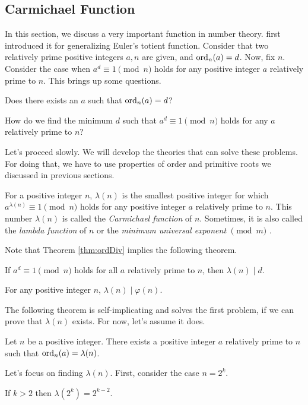 \subsection{Carmichael Function}
In this section, we discuss a very important function in number theory. \textcite{carmichael_1910} first introduced it for generalizing Euler's totient function. Consider that two relatively prime positive integers $a,n$ are given, and $\operatorname{ord}_n(a)=d$. Now, fix $n$. Consider the case when $a^d\equiv1\pmod n$ holds for any positive integer $a$ relatively prime to $n$. This brings up some questions.
\begin{problem}\label{prob:CarmichaelQuestion1}
	Does there exists an $a$ such that $\operatorname{ord}_n(a)=d$?
\end{problem}

\begin{problem}\label{prob:CarmichaelQuestion2}
	How do we find the minimum $d$ such that $a^d\equiv1\pmod n$ holds for any $a$ relatively prime to $n$?
\end{problem}
Let's proceed slowly. We will develop the theories that can solve these problems. For doing that, we have to use properties of order and primitive roots we discussed in previous sections.
\begin{definition}
	For a positive integer $n$, $\lambda(n)$ is the smallest positive integer for which $a^{\lambda(n)}\equiv1\pmod n$ holds for any positive integer $a$ relatively prime to $n$. This number $\lambda(n)$ is called the \textit{Carmichael function} of $n$. Sometimes, it is also called the \textit{lambda function} of $n$ or the \textit{minimum universal exponent} $\pmod m$ \textcite[Chapter $\S$VI, Section $4$, Page $265$]{sierpinski_schinzel_1988}.
\end{definition}
Note that Theorem \eqref{thm:ordDiv} implies the following theorem.
\begin{theorem}\label{thm:carDiv}
	If $a^d\equiv1\pmod n$ holds for all $a$ relatively prime to $n$, then $\lambda(n)\mid d$.
\end{theorem}

\begin{corollary}\label{cor:LambdaDividesPhi}
	For any positive integer $n$, $\lambda(n)\mid \varphi(n)$.
\end{corollary}
The following theorem is self-implicating and solves the first problem, if we can prove that $\lambda(n)$ exists. For now, let's assume it does.
\begin{theorem}
	Let $n$ be a positive integer. There exists a positive integer $a$ relatively prime to $n$ such that $\operatorname{ord}_n(a)=\lambda(n)$.
\end{theorem}
Let's focus on finding $\lambda(n)$. First, consider the case $n=2^k$.
\begin{theorem}
	If $k>2$ then $\lambda(2^k)=2^{k-2}$.
\end{theorem}

